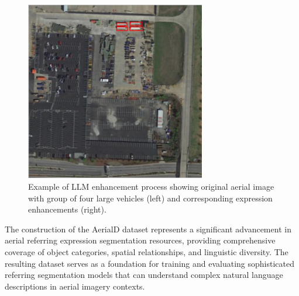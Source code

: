 \begin{figure}[H]
\centering
\begin{minipage}{0.5\textwidth}
\centering
\includegraphics[width=0.7\textwidth]{./Images/example_group.png}
\end{minipage}%
\begin{minipage}{0.5\textwidth}
\centering
\hspace{-1cm}
\end{minipage}
\caption{Example of LLM enhancement process showing original aerial image with group of four large vehicles (left) and corresponding expression enhancements (right).}
\label{fig:llm_enhancement_example}
\end{figure}

The construction of the AerialD dataset represents a significant advancement in aerial referring expression segmentation resources, providing comprehensive coverage of object categories, spatial relationships, and linguistic diversity. The resulting dataset serves as a foundation for training and evaluating sophisticated referring segmentation models that can understand complex natural language descriptions in aerial imagery contexts.



